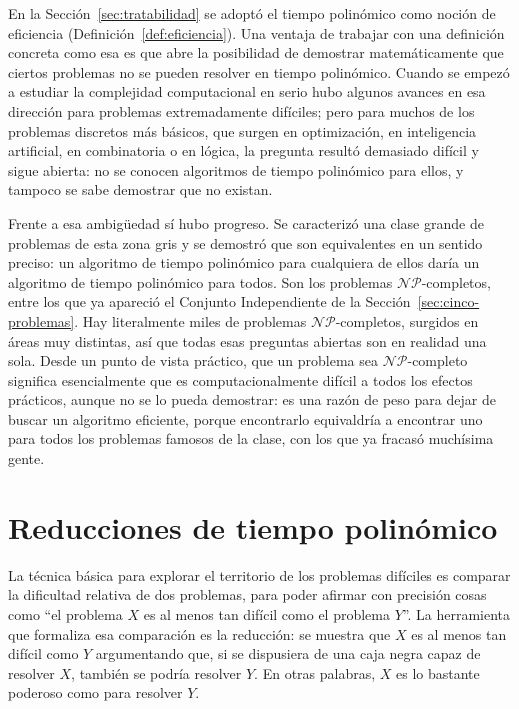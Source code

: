 \documentclass[12pt, spanish, oneside, openany]{book}
\newcommand{\NP}{\mathcal{NP}}
\theoremstyle{uprightplain}
\theoremstyle{definition}
\theoremstyle{remark}
\theoremstyle{definition}
\begin{document}
En la Sección~\ref{sec:tratabilidad} se adoptó el tiempo polinómico como noción de eficiencia (Definición~\ref{def:eficiencia}). Una ventaja de trabajar con una definición concreta como esa es que abre la posibilidad de demostrar matemáticamente que ciertos problemas no se pueden resolver en tiempo polinómico. Cuando se empezó a estudiar la complejidad computacional en serio hubo algunos avances en esa dirección para problemas extremadamente difíciles; pero para muchos de los problemas discretos más básicos, que surgen en optimización, en inteligencia artificial, en combinatoria o en lógica, la pregunta resultó demasiado difícil y sigue abierta: no se conocen algoritmos de tiempo polinómico para ellos, y tampoco se sabe demostrar que no existan.

Frente a esa ambigüedad sí hubo progreso. Se caracterizó una clase grande de problemas de esta zona gris y se demostró que son equivalentes en un sentido preciso: un algoritmo de tiempo polinómico para cualquiera de ellos daría un algoritmo de tiempo polinómico para todos. Son los problemas $\NP$-completos, entre los que ya apareció el Conjunto Independiente de la Sección~\ref{sec:cinco-problemas}. Hay literalmente miles de problemas $\NP$-completos, surgidos en áreas muy distintas, así que todas esas preguntas abiertas son en realidad una sola. Desde un punto de vista práctico, que un problema sea $\NP$-completo significa esencialmente que es computacionalmente difícil a todos los efectos prácticos, aunque no se lo pueda demostrar: es una razón de peso para dejar de buscar un algoritmo eficiente, porque encontrarlo equivaldría a encontrar uno para todos los problemas famosos de la clase, con los que ya fracasó muchísima gente.


\section{Reducciones de tiempo polinómico}
\label{sec:np-reducciones}

La técnica básica para explorar el territorio de los problemas difíciles es comparar la dificultad relativa de dos problemas, para poder afirmar con precisión cosas como ``el problema $X$ es al menos tan difícil como el problema $Y$''. La herramienta que formaliza esa comparación es la reducción: se muestra que $X$ es al menos tan difícil como $Y$ argumentando que, si se dispusiera de una caja negra capaz de resolver $X$, también se podría resolver $Y$. En otras palabras, $X$ es lo bastante poderoso como para resolver $Y$.
\end{document}
